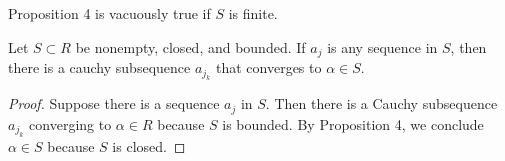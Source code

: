 \documentclass{article}
\begin{document}
\begin{remark}
    Proposition 4 is vacuously true if \( S \) is finite.
\end{remark}

\begin{corollary}
    Let \( S \subset R \) be nonempty, closed, and bounded. If \( a_j \) is any 
    sequence in \( S \), then there is a cauchy subsequence \( a_{j_k} \) that converges
    to \( \alpha \in S \).
\end{corollary}
\begin{proof}
    Suppose there is a sequence \( a_j \) in \( S \). Then  there is a Cauchy
    subsequence \( a_{j_k} \) converging to \( \alpha \in R \) because \( S \) is bounded.
    By Proposition 4, we conclude \( \alpha \in S \) because \( S \) is closed.
\end{proof} 
\end{document}
